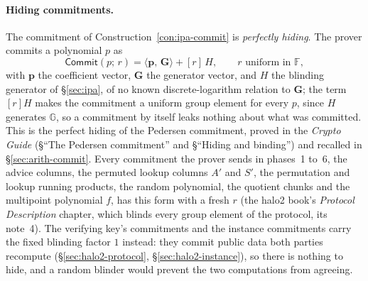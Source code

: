 \documentclass[11pt,a4paper]{article}
\theoremstyle{definition}
\newcommand{\F}{\mathbb{F}}
\newcommand{\G}{\mathbb{G}}
\newcommand{\ip}[2]{\langle #1,\, #2 \rangle}
\newcommand{\Comm}{\mathsf{Commit}}
\begin{document}
\paragraph{Hiding commitments.}
The commitment of Construction~\ref{con:ipa-commit} is \emph{perfectly
hiding}. The prover commits a polynomial $p$ as
\[
\Comm(p;\, r) = \ip{\mathbf p}{\mathbf G} + [r]\,H,
\qquad r \text{ uniform in } \F,
\]
with $\mathbf p$ the coefficient vector, $\mathbf G$ the generator
vector, and $H$ the blinding generator of \S\ref{sec:ipa}, of no known
discrete-logarithm relation to $\mathbf G$; the term $[r]H$ makes the
commitment a uniform group element for every $p$, since $H$ generates
$\G$, so a commitment by itself leaks nothing about what was committed.
This is the perfect hiding of the Pedersen commitment, proved in the
\emph{Crypto Guide} (\S``The Pedersen commitment'' and \S``Hiding and
binding'') and recalled in \S\ref{sec:arith-commit}. Every commitment
the prover sends in phases~1 to~6, the advice columns, the permuted
lookup columns $A'$ and $S'$, the permutation and lookup running
products, the random polynomial, the quotient chunks and the multipoint
polynomial $f$, has this form with a fresh $r$ (the halo2 book's
\emph{Protocol Description} chapter, which blinds every group element of
the protocol, its note~4). The verifying key's commitments and the
instance commitments carry the fixed blinding factor $1$ instead: they
commit public data both parties recompute (\S\ref{sec:halo2-protocol},
\S\ref{sec:halo2-instance}), so there is nothing to hide, and a random
blinder would prevent the two computations from agreeing.
\end{document}
